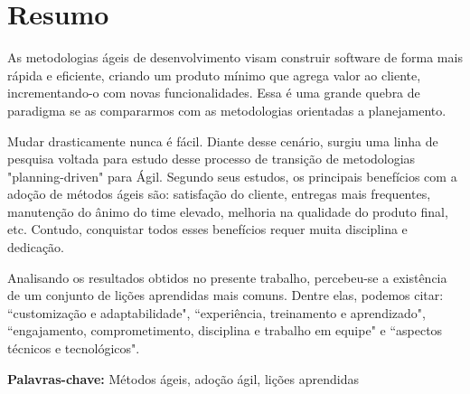 \chapter*{Resumo}

As metodologias ágeis de desenvolvimento visam construir software de forma mais rápida e eficiente, criando um produto mínimo que agrega valor ao cliente, incrementando-o com novas funcionalidades. Essa é uma grande quebra de paradigma se as compararmos com as metodologias orientadas a planejamento.

Mudar drasticamente nunca é fácil. Diante desse cenário, surgiu uma linha de pesquisa voltada para estudo desse processo de transição de metodologias "planning-driven" para Ágil. Segundo seus estudos, os principais benefícios com a adoção de métodos ágeis são: satisfação do cliente, entregas mais frequentes, manutenção do ânimo do time elevado, melhoria na qualidade do produto final, etc. Contudo, conquistar todos esses benefícios requer muita disciplina e dedicação.

Analisando os resultados obtidos no presente trabalho, percebeu-se a existência de um conjunto de lições aprendidas mais comuns. Dentre elas, podemos citar: ``customização e adaptabilidade", ``experiência, treinamento e aprendizado", ``engajamento, comprometimento, disciplina e trabalho em equipe" e ``aspectos técnicos e tecnológicos".

\textbf{Palavras-chave:} Métodos ágeis, adoção ágil, lições aprendidas
